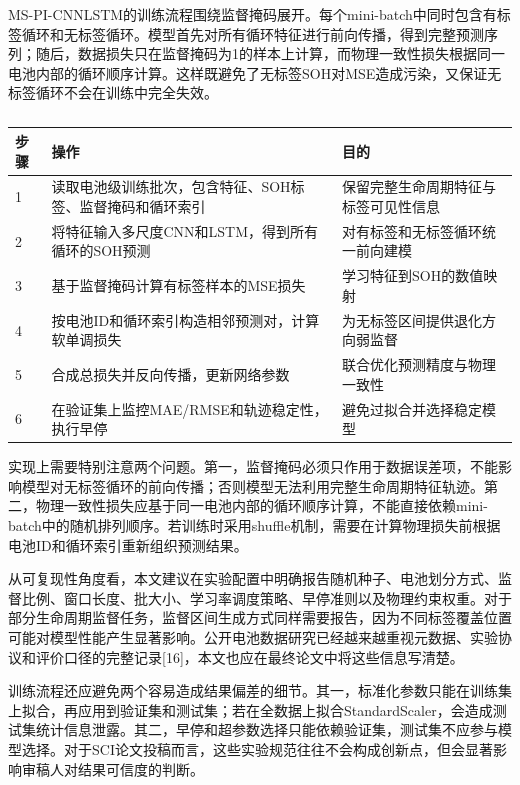\documentclass[12pt, a4paper]{ctexart}
\begin{document}
MS-PI-CNNLSTM的训练流程围绕监督掩码展开。每个mini-batch中同时包含有标签循环和无标签循环。模型首先对所有循环特征进行前向传播，得到完整预测序列；随后，数据损失只在监督掩码为1的样本上计算，而物理一致性损失根据同一电池内部的循环顺序计算。这样既避免了无标签SOH对MSE造成污染，又保证无标签循环不会在训练中完全失效。




\begin{table}[H]
  \centering
  \begin{tabular}{lll}
  \toprule
  步骤 & 操作 & 目的 \\
  \midrule
  1 & 读取电池级训练批次，包含特征、SOH标签、监督掩码和循环索引 & 保留完整生命周期特征与标签可见性信息 \\
  2 & 将特征输入多尺度CNN和LSTM，得到所有循环的SOH预测 & 对有标签和无标签循环统一前向建模 \\
  3 & 基于监督掩码计算有标签样本的MSE损失 & 学习特征到SOH的数值映射 \\
  4 & 按电池ID和循环索引构造相邻预测对，计算软单调损失 & 为无标签区间提供退化方向弱监督 \\
  5 & 合成总损失并反向传播，更新网络参数 & 联合优化预测精度与物理一致性 \\
  6 & 在验证集上监控MAE/RMSE和轨迹稳定性，执行早停 & 避免过拟合并选择稳定模型 \\
  \bottomrule
  \end{tabular}
  \caption{}
  \label{tab:}
\end{table}


实现上需要特别注意两个问题。第一，监督掩码必须只作用于数据误差项，不能影响模型对无标签循环的前向传播；否则模型无法利用完整生命周期特征轨迹。第二，物理一致性损失应基于同一电池内部的循环顺序计算，不能直接依赖mini-batch中的随机排列顺序。若训练时采用shuffle机制，需要在计算物理损失前根据电池ID和循环索引重新组织预测结果。


从可复现性角度看，本文建议在实验配置中明确报告随机种子、电池划分方式、监督比例、窗口长度、批大小、学习率调度策略、早停准则以及物理约束权重。对于部分生命周期监督任务，监督区间生成方式同样需要报告，因为不同标签覆盖位置可能对模型性能产生显著影响。公开电池数据研究已经越来越重视元数据、实验协议和评价口径的完整记录[16]，本文也应在最终论文中将这些信息写清楚。


训练流程还应避免两个容易造成结果偏差的细节。其一，标准化参数只能在训练集上拟合，再应用到验证集和测试集；若在全数据上拟合StandardScaler，会造成测试集统计信息泄露。其二，早停和超参数选择只能依赖验证集，测试集不应参与模型选择。对于SCI论文投稿而言，这些实验规范往往不会构成创新点，但会显著影响审稿人对结果可信度的判断。
\end{document}
